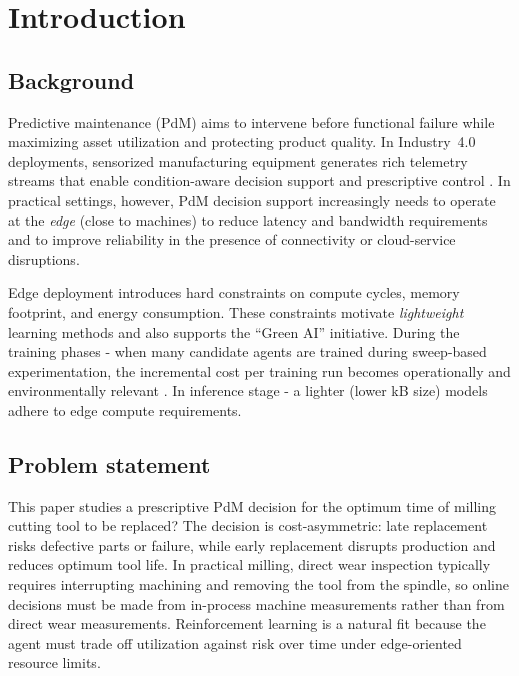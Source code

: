 \documentclass[sn-basic]{sn-jnl} %
\begin{document}

\maketitle

\section{Introduction}
\subsection{Background}
Predictive maintenance (PdM) aims to intervene before functional failure while maximizing asset utilization and protecting product quality. In Industry~4.0 deployments, sensorized manufacturing equipment generates rich telemetry streams that enable condition-aware decision support and prescriptive control \cite{Zonta2020, Compare2020}. In practical settings, however, PdM decision support increasingly needs to operate at the \emph{edge} (close to machines) to reduce latency and bandwidth requirements and to improve reliability in the presence of connectivity or cloud-service disruptions.

Edge deployment introduces hard constraints on compute cycles, memory footprint, and energy consumption. These constraints motivate \emph{lightweight} learning methods and also supports the ``Green AI'' initiative. During the training phases - when many candidate agents are trained during sweep-based experimentation, the incremental cost per training run becomes operationally and environmentally relevant \cite{Schwartz2020, Strubell2019}. In inference stage - a lighter (lower kB size) models adhere to edge compute requirements. 

\subsection{Problem statement}
This paper studies a prescriptive PdM decision for the optimum time of milling cutting tool to be replaced? The decision is cost-asymmetric: late replacement risks defective parts or failure, while early replacement disrupts production and reduces optimum  tool life. In practical milling, direct wear inspection typically requires interrupting machining and removing the tool from the spindle, so online decisions must be made from in-process machine measurements rather than from direct wear measurements. Reinforcement learning is a natural fit because the agent must trade off utilization against risk over time under edge-oriented resource limits.
\end{document}
